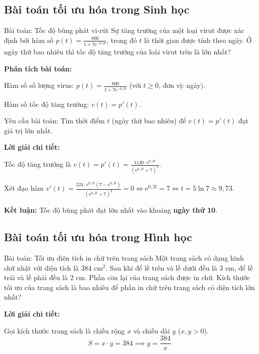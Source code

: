 \documentclass[12pt,a4paper]{article}
\begin{document}
\subsection{Bài toán tối ưu hóa trong Sinh học}

\begin{problembox}{Bài toán: Tốc độ bùng phát vi-rút}
Sự tăng trưởng của một loại virut được xác định bởi hàm số $p(t) = \frac{800}{1 + 7\mathrm{e}^{-0,2t}}$, trong đó $t$ là thời gian được tính theo ngày. Ở ngày thứ bao nhiêu thì tốc độ tăng trưởng của loài virut trên là lớn nhất?
\end{problembox}

\noindent\textbf{Phân tích bài toán:} 

Hàm số số lượng virus: $p(t) = \frac{800}{1 + 7\mathrm{e}^{-0{,}2t}}$ (với $t \ge 0$, đơn vị: ngày). 

Hàm số tốc độ tăng trưởng: $v(t) = p'(t)$. 

Yêu cầu bài toán: Tìm thời điểm $t$ (ngày thứ bao nhiêu) để $v(t) = p'(t)$ đạt giá trị lớn nhất.


\noindent\textbf{Lời giải chi tiết:}

Tốc độ tăng trưởng là $v(t) = p'(t) = \frac{1120 \cdot \mathrm{e}^{0,2t}}{(\mathrm{e}^{0,2t} + 7)^2}$.

Xét đạo hàm $v'(t) = \frac{224 \cdot \mathrm{e}^{0,2t}(7 - \mathrm{e}^{0,2t})}{(\mathrm{e}^{0,2t} + 7)^3} = 0 \iff \mathrm{e}^{0,2t} = 7 \iff t = 5\ln 7 \approx 9,73$.

\noindent\textbf{Kết luận:} Tốc độ bùng phát đạt lớn nhất vào khoảng \textbf{ngày thứ 10}.

\subsection{Bài toán tối ưu hóa trong Hình học}

\begin{problembox}{Bài toán: Tối ưu diện tích in chữ trên trang sách}
Một trang sách có dạng hình chữ nhật với diện tích là $384\text{ cm}^2$. Sau khi để lề trên và lề dưới đều là $3\text{ cm}$, để lề trái và lề phải đều là $2\text{ cm}$. Phần còn lại của trang sách được in chữ. Kích thước tối ưu của trang sách là bao nhiêu để phần in chữ trên trang sách có diện tích lớn nhất?
\end{problembox}

\noindent\textbf{Lời giải chi tiết:}

Gọi kích thước trang sách là chiều rộng $x$ và chiều dài $y$ ($x, y > 0$).
\[ S = x \cdot y = 384 \implies y = \frac{384}{x} \]
\end{document}
